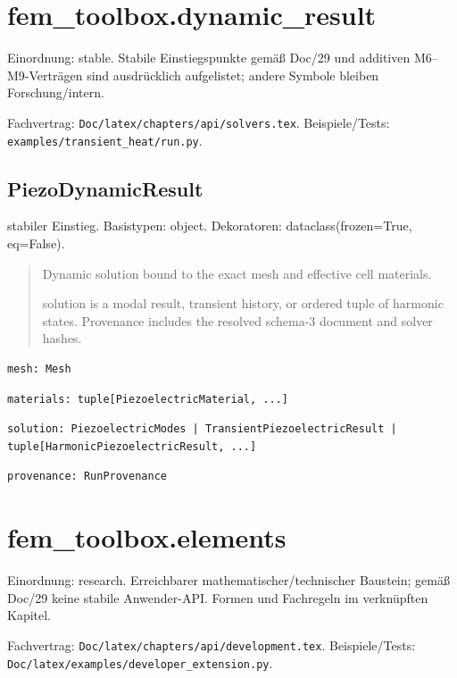 \section{fem\_toolbox.dynamic\_result}
Einordnung: stable. Stabile Einstiegspunkte gemäß Doc/29 und additiven M6–M9-Verträgen sind ausdrücklich aufgelistet; andere Symbole bleiben Forschung/intern.
\par Fachvertrag: \nolinkurl{Doc/latex/chapters/api/solvers.tex}. Beispiele/Tests:
\nolinkurl{examples/transient_heat/run.py}.
\subsection{PiezoDynamicResult}
stabiler Einstieg.
Basistypen: object. Dekoratoren: dataclass(frozen=True, eq=False).
\begin{quote}
Dynamic solution bound to the exact mesh and effective cell materials.\par solution is a modal result, transient history, or ordered tuple of harmonic states. Provenance includes the resolved schema-3 document and solver hashes.
\end{quote}
\begin{lstlisting}
mesh: Mesh
\end{lstlisting}
\begin{lstlisting}
materials: tuple[PiezoelectricMaterial, ...]
\end{lstlisting}
\begin{lstlisting}
solution: PiezoelectricModes | TransientPiezoelectricResult | tuple[HarmonicPiezoelectricResult, ...]
\end{lstlisting}
\begin{lstlisting}
provenance: RunProvenance
\end{lstlisting}
\section{fem\_toolbox.elements}
Einordnung: research. Erreichbarer mathematischer/technischer Baustein; gemäß Doc/29 keine stabile Anwender-API. Formen und Fachregeln im verknüpften Kapitel.
\par Fachvertrag: \nolinkurl{Doc/latex/chapters/api/development.tex}. Beispiele/Tests:
\nolinkurl{Doc/latex/examples/developer_extension.py}.
